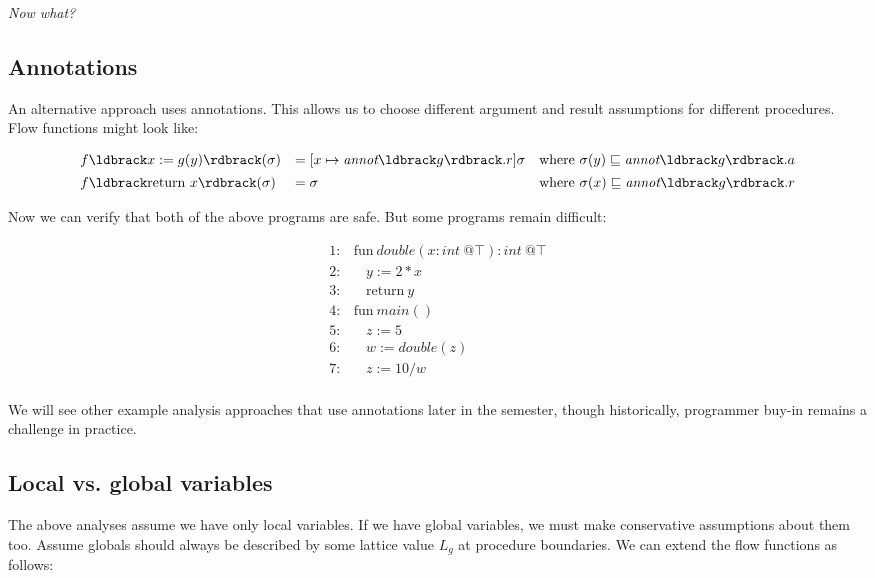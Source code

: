 \documentclass[11pt]{article}
\newcommand{\parg}[1] %
  {\ldbrack #1 \rdbrack}
\newcommand{\alap}{\sqsubseteq}
\begin{document}
\noindent \emph{Now what?}


\subsection{Annotations}

An alternative approach uses annotations.  This allows us to choose different argument and result assumptions for different procedures.  Flow functions might look like:

\[
\begin{array}{lll}

f\parg{x := g(y)}(\sigma) & = [x \mapsto \textit{annot}\parg{g}.r]\sigma & \mbox{where}~ \sigma(y) \alap \textit{annot}\parg{g}.a \\[1ex]
f\parg{\mbox{return}~ x}(\sigma) & = \sigma & \mbox{where}~ \sigma(x) \alap \textit{annot}\parg{g}.r \\

\end{array}
\]

Now we can verify that both of the above programs are safe.  But some programs remain difficult:

\[
\begin{array}{ll}
1: & \mbox{fun}~ \textit{double}(x:int ~@\top):int ~@\top\\
2: & ~~~~y := 2 * x\\
3: & ~~~~\mbox{return}~ y\\[1ex]

4: & \mbox{fun}~ \textit{main}()\\
5: & ~~~~z := 5\\
6: & ~~~~w := \textit{double}(z)\\
7: & ~~~~z := 10/w\\[1ex]
\end{array}
\]

\noindent We will see other example analysis approaches that use annotations later in the semester, though historically, programmer buy-in remains a challenge in practice.

\subsection{Local vs. global variables}

The above analyses assume we have only local variables.  If we have global variables, we must make conservative assumptions about them too.  Assume globals should always be described by some lattice value $L_g$ at procedure boundaries.  We can extend the flow functions as follows:
\end{document}
